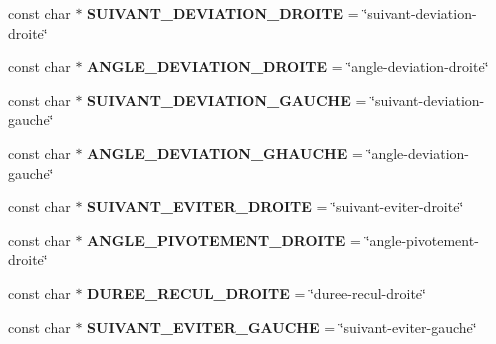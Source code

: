 \begin{DoxyCompactItemize}
\item 
const char $\ast$ {\bfseries S\+U\+I\+V\+A\+N\+T\+\_\+\+D\+E\+V\+I\+A\+T\+I\+O\+N\+\_\+\+D\+R\+O\+I\+TE} = \char`\"{}suivant-\/deviation-\/droite\char`\"{}\hypertarget{class_element_x_m_l_a6eb91f3e55abc0e64fe411832a48e4a2}{}\label{class_element_x_m_l_a6eb91f3e55abc0e64fe411832a48e4a2}

\item 
const char $\ast$ {\bfseries A\+N\+G\+L\+E\+\_\+\+D\+E\+V\+I\+A\+T\+I\+O\+N\+\_\+\+D\+R\+O\+I\+TE} = \char`\"{}angle-\/deviation-\/droite\char`\"{}\hypertarget{class_element_x_m_l_a217111040790187dfd6753b14dc70718}{}\label{class_element_x_m_l_a217111040790187dfd6753b14dc70718}

\item 
const char $\ast$ {\bfseries S\+U\+I\+V\+A\+N\+T\+\_\+\+D\+E\+V\+I\+A\+T\+I\+O\+N\+\_\+\+G\+A\+U\+C\+HE} = \char`\"{}suivant-\/deviation-\/gauche\char`\"{}\hypertarget{class_element_x_m_l_aa7ef39594b7b74d6e9482db8db19fea7}{}\label{class_element_x_m_l_aa7ef39594b7b74d6e9482db8db19fea7}

\item 
const char $\ast$ {\bfseries A\+N\+G\+L\+E\+\_\+\+D\+E\+V\+I\+A\+T\+I\+O\+N\+\_\+\+G\+H\+A\+U\+C\+HE} = \char`\"{}angle-\/deviation-\/gauche\char`\"{}\hypertarget{class_element_x_m_l_a39092e00cdba5191fee026f60efa0771}{}\label{class_element_x_m_l_a39092e00cdba5191fee026f60efa0771}

\item 
const char $\ast$ {\bfseries S\+U\+I\+V\+A\+N\+T\+\_\+\+E\+V\+I\+T\+E\+R\+\_\+\+D\+R\+O\+I\+TE} = \char`\"{}suivant-\/eviter-\/droite\char`\"{}\hypertarget{class_element_x_m_l_a622e97ced11fd04ac663cf07bc2e1dcc}{}\label{class_element_x_m_l_a622e97ced11fd04ac663cf07bc2e1dcc}

\item 
const char $\ast$ {\bfseries A\+N\+G\+L\+E\+\_\+\+P\+I\+V\+O\+T\+E\+M\+E\+N\+T\+\_\+\+D\+R\+O\+I\+TE} = \char`\"{}angle-\/pivotement-\/droite\char`\"{}\hypertarget{class_element_x_m_l_aff27bf23307230a01064dd2f6f3d3f66}{}\label{class_element_x_m_l_aff27bf23307230a01064dd2f6f3d3f66}

\item 
const char $\ast$ {\bfseries D\+U\+R\+E\+E\+\_\+\+R\+E\+C\+U\+L\+\_\+\+D\+R\+O\+I\+TE} = \char`\"{}duree-\/recul-\/droite\char`\"{}\hypertarget{class_element_x_m_l_a810ad28daf471cea797f5464f4664cdb}{}\label{class_element_x_m_l_a810ad28daf471cea797f5464f4664cdb}

\item 
const char $\ast$ {\bfseries S\+U\+I\+V\+A\+N\+T\+\_\+\+E\+V\+I\+T\+E\+R\+\_\+\+G\+A\+U\+C\+HE} = \char`\"{}suivant-\/eviter-\/gauche\char`\"{}\hypertarget{class_element_x_m_l_acfaabadff6824e18dc919ae669f532b3}{}\label{class_element_x_m_l_acfaabadff6824e18dc919ae669f532b3}


\end{DoxyCompactItemize}
